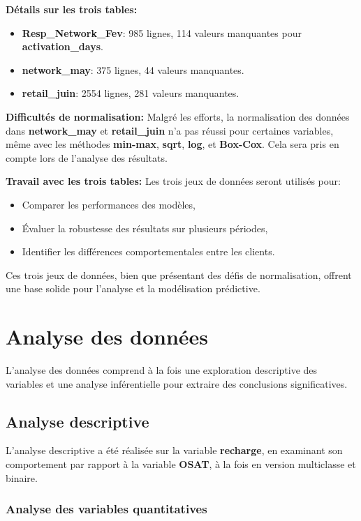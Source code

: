 \noindent \textbf{Détails sur les trois tables:}  
\begin{itemize}
    \item \textbf{Resp\_Network\_Fev}: 985 lignes, 114 valeurs manquantes pour \textbf{activation\_days}.
    \item \textbf{network\_may}: 375 lignes, 44 valeurs manquantes.
    \item \textbf{retail\_juin}: 2554 lignes, 281 valeurs manquantes.
\end{itemize}

\noindent \textbf{\checkmark Difficultés de normalisation:}  
Malgré les efforts, la normalisation des données dans \textbf{network\_may} et \textbf{retail\_juin} n'a pas réussi pour certaines variables, même avec les méthodes \textbf{min-max}, \textbf{sqrt}, \textbf{log}, et \textbf{Box-Cox}. Cela sera pris en compte lors de l'analyse des résultats.

\noindent \textbf{\checkmark Travail avec les trois tables:}  
Les trois jeux de données seront utilisés pour:
\begin{itemize}
    \item Comparer les performances des modèles,
    \item Évaluer la robustesse des résultats sur plusieurs périodes,
    \item Identifier les différences comportementales entre les clients.
\end{itemize}

Ces trois jeux de données, bien que présentant des défis de normalisation, offrent une base solide pour l'analyse et la modélisation prédictive.

\section{Analyse des données}
L'analyse des données comprend à la fois une exploration descriptive des variables et une analyse inférentielle pour extraire des conclusions significatives.

\subsection{Analyse descriptive}

L'analyse descriptive a été réalisée sur la variable \textbf{recharge}, en examinant son comportement par rapport à la variable \textbf{OSAT}, à la fois en version multiclasse et binaire.
\subsubsection{Analyse des variables quantitatives}

